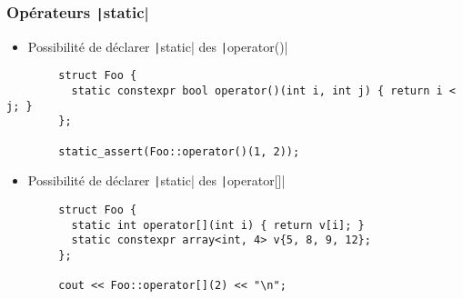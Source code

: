\documentclass[C++.tex]{subfiles}
\begin{document}
\begin{frame}[fragile]
	\frametitle{Opérateurs \texttt|static|}
	 \begin{itemize}
	 	\item Possibilité de déclarer \texttt|static| des \texttt|operator()|
	 \end{itemize}

 	\begin{verbatim}
		struct Foo {
		  static constexpr bool operator()(int i, int j) { return i < j; }
		};

		static_assert(Foo::operator()(1, 2));
	\end{verbatim}

	 \begin{itemize}
	 	\item Possibilité de déclarer \texttt|static| des \texttt|operator[]|
	 \end{itemize}

 	\begin{verbatim}
		struct Foo {
		  static int operator[](int i) { return v[i]; }
		  static constexpr array<int, 4> v{5, 8, 9, 12};
		};

		cout << Foo::operator[](2) << "\n";
	\end{verbatim}


\end{frame}
\end{document}
